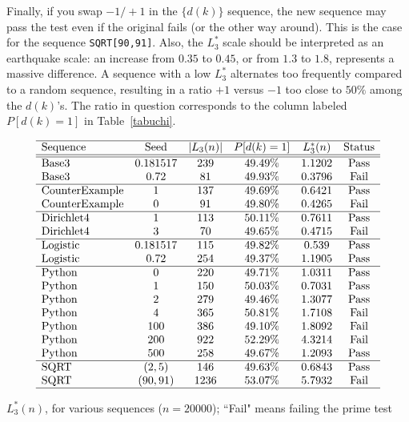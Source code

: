 \documentclass[oneside,10pt]{book}
\begin{document}
Finally, if you swap $-1 / +1$ in the $\{d(k)\}$ sequence, the new sequence may pass the test even if the original fails (or the other way around). This is the case for the sequence \texttt{SQRT[90,91]}. Also, the $L^*_3$ scale should be interpreted as an earthquake scale: an increase from $0.35$ to $0.45$, or from $1.3$ to $1.8$, represents a massive difference. A sequence with a low $L^*_3$ alternates too frequently compared to a random
sequence, resulting in a ratio $+1$ versus $-1$ too close to $50\%$ among the $d(k)$'s. The ratio in question corresponds to the
 column labeled $P[d(k)=1]$ in Table~\ref{tabuchi}.



\begin{table}%
\[
\begin{array}{lccccc}
\hline
\text{Sequence}	& \text{Seed}&	|L_3(n)|&	P[d(k)=1]&	L^*_3(n) & \text{Status}\\
\hline
\hline
\text{Base3} & 0.181517&239&49.49\%&1.1202 & \text{Pass}\\
\text{Base3} & 0.72&81&49.93\%&0.3796 & \text{Fail}\\
\hline
\text{CounterExample} & 1&137&49.69\%&0.6421 &  \text{Pass}\\
\text{CounterExample} & 0&91&49.80\%&0.4265 &  \text{Fail}\\
\hline
\text{Dirichlet4} & 1&113&50.11\%&0.7611 &  \text{Pass}\\
\text{Dirichlet4} & 3&70&49.65\%&0.4715 &  \text{Fail}\\
\hline
\text{Logistic} & 0.181517&115&49.82\%&0.539 &  \text{Pass}\\
\text{Logistic} & 0.72&254&49.37\%&1.1905 &  \text{Pass}\\
\hline
\text{Python} & 0&220&49.71\%&1.0311 &  \text{Pass}\\
\text{Python} & 1&150&50.03\%&0.7031 &  \text{Pass}\\
\text{Python} & 2&279&49.46\%&1.3077 &  \text{Pass}\\
\text{Python} & 4&365&50.81\%&1.7108 & \text{Fail} \\
\text{Python} & 100&386&49.10\%&1.8092 &  \text{Fail}\\
\text{Python} & 200&922&52.29\%&4.3214 &  \text{Fail}\\
\text{Python} & 500&258&49.67\%&1.2093 &  \text{Pass}\\
\hline
\text{SQRT} & (2, 5)&146&49.63\%&0.6843 &  \text{Pass}\\
\text{SQRT} & (90, 91)&1236&53.07\%&5.7932 & \text{Fail} \\
\hline
\end{array}
\]
\caption{\label{tabuchi} $L^*_3(n)$, for various sequences ($n=\num{20000}$); ``Fail" means failing the prime test}
\end{table}
\end{document}
